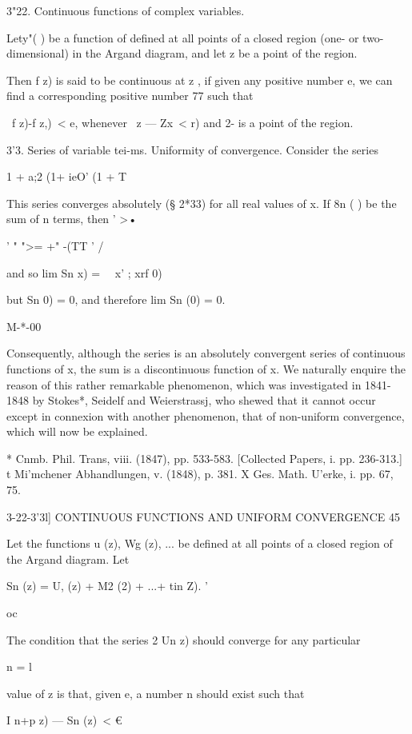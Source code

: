 3"22. Continuous functions of complex variables.

Lety"( ) be a function of defined at all points of a closed region
(one- or two-dimensional) in the Argand diagram, and let z be a point
of the region.

Then f z) is said to be continuous at z , if given any positive number
e, we can find a corresponding positive number 77 such that

\ f z)-f z,)\ < e, whenever \ z — Zx\ < r) and 2- is a point of the
region.

3'3. Series of variable tei-ms. Uniformity of convergence. Consider
the series

  1 + a;2 (1+ ieO' (1 + T

This series converges absolutely (§ 2*33) for all real values of x. If
8n ( ) be the sum of n terms, then ' >•

' " ">= +" -(TT ' /

and so lim Sn x) = \ \ x' ; xrf 0)

but Sn 0) = 0, and therefore lim Sn (0) = 0.

M-*-00

Consequently, although the series is an absolutely convergent series
of continuous functions of x, the sum is a discontinuous function of
x. We naturally enquire the reason of this rather remarkable
phenomenon, which was investigated in 1841-1848 by Stokes*, Seidelf
and Weierstrassj, who shewed that it cannot occur except in connexion
with another phenomenon, that of non-uniform convergence, which will
now be explained.

* Cnmb. Phil. Trans, viii. (1847), pp. 533-583. [Collected Papers, i.
pp. 236-313.] t Mi'mchener Abhandlungen, v. (1848), p. 381. X Ges.
Math. U'erke, i. pp. 67, 75.



3-22-3'3l] CONTINUOUS FUNCTIONS AND UNIFORM CONVERGENCE 45

Let the functions u (z), Wg (z), ... be defined at all points of a
closed region of the Argand diagram. Let

Sn (z) = U, (z) + M2 (2) + ...+ tin Z). '

oc

The condition that the series 2 Un z) should converge for any
particular

n = l

value of z is that, given e, a number n should exist such that

I n+p z) — Sn (z)\ < €

